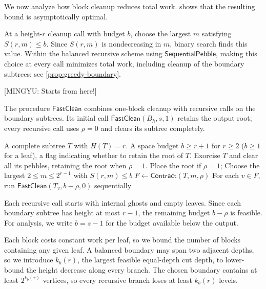\documentclass[11pt]{article}
\theoremstyle{definition}
\theoremstyle{remark}
\newcommand{\Fast}{\mathsf{SequentialPebble}}
\newcommand{\Clean}{\mathsf{FastClean}}
\newcommand{\Contract}{\mathsf{Contract}}
\newcommand{\mingyu}[1]{{\color{magenta}\footnotesize [MINGYU: #1]}} %
\begin{document}
We now analyze how block cleanup reduces total work.  shows that the resulting bound is asymptotically optimal.

At a height-$r$ cleanup call with budget $b$, choose the largest $m$ satisfying $S(r,m)\le b$. Since $S(r,m)$ is nondecreasing in $m$, binary search finds this value. Within the balanced recursive scheme using $\Fast$, making this choice at every call minimizes total work, including cleanup of the boundary subtrees; see \cref{prop:greedy-boundary}.

\mingyu{Starts from here!}

The procedure $\Clean$ combines one-block cleanup with recursive calls on the boundary subtrees. Its initial call $\Clean(B_h,s,1)$ retains the output root; every recursive call uses $\rho=0$ and clears its subtree completely.

\begin{algorithm}[H]
\caption{Complete-tree block cleanup $\Clean(T,b,\rho)$}
\label{alg:seq-clean}
\begin{algorithmic}[1]
\Require A complete subtree $T$ with $H(T)=r$.
\Require A space budget $b\ge r+1$ for $r\ge2$ ($b\ge1$ for a leaf), a flag indicating whether to retain the root of $T$.
\Ensure Exorcise $T$ and clear all its pebbles, retaining the root when $\rho=1$.
 \State Place the root if $\rho=1$; \Return
\EndIf
\State Choose the largest $2\le m\le2^{r-1}$ with $S(r,m)\le b$
\State $F\gets\Contract(T,m,\rho)$
\State For each $v\in F$, run $\Clean(T_v,b-\rho,0)$ sequentially
\end{algorithmic}
\end{algorithm}

Each recursive call starts with internal ghosts and empty leaves. Since each boundary subtree has height at most $r-1$, the remaining budget $b-\rho$ is feasible. For analysis, we write $b=s-1$ for the budget available below the output.

Each block costs constant work per leaf, so we bound the number of blocks containing any given leaf. A balanced boundary may span two adjacent depths, so we introduce $k_b(r)$, the largest feasible equal-depth cut depth, to lower-bound the height decrease along every branch. The chosen boundary contains at least $2^{k_b(r)}$ vertices, so every recursive branch loses at least $k_b(r)$ levels.
\end{document}
